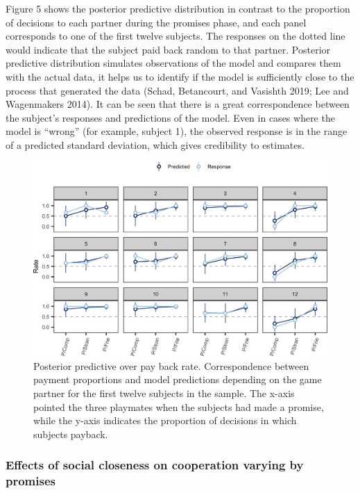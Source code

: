 \documentclass[smallextended]{svjour3}       %
\begin{document}
Figure 5 shows the posterior predictive distribution in contrast to the
proportion of decisions to each partner during the promises phase, and
each panel corresponds to one of the first twelve subjects. The
responses on the dotted line would indicate that the subject paid back
random to that partner. Posterior predictive distribution simulates
observations of the model and compares them with the actual data, it
helps us to identify if the model is sufficiently close to the process
that generated the data (Schad, Betancourt, and Vasishth 2019; Lee and
Wagenmakers 2014). It can be seen that there is a great correspondence
between the subject's responses and predictions of the model. Even in
cases where the model is ``wrong'' (for example, subject 1), the
observed response is in the range of a predicted standard deviation,
which gives credibility to estimates.

\begin{figure}

{\centering \includegraphics[width=1\linewidth,height=0.42\textheight]{behavioral-promises_files/figure-latex/fig5-1} 

}

\caption{Posterior predictive over pay back rate. Correspondence between payment proportions and model predictions depending on the game partner for the first twelve subjects in the sample. The x-axis pointed the three playmates when the subjects had made a promise, while the y-axis indicates the proportion of decisions in which subjects payback.}\label{fig:fig5}
\end{figure}

\hypertarget{effects-of-social-closeness-on-cooperation-varying-by-promises}{%
\subsubsection{Effects of social closeness on cooperation varying by
promises}\label{effects-of-social-closeness-on-cooperation-varying-by-promises}}
\end{document}
